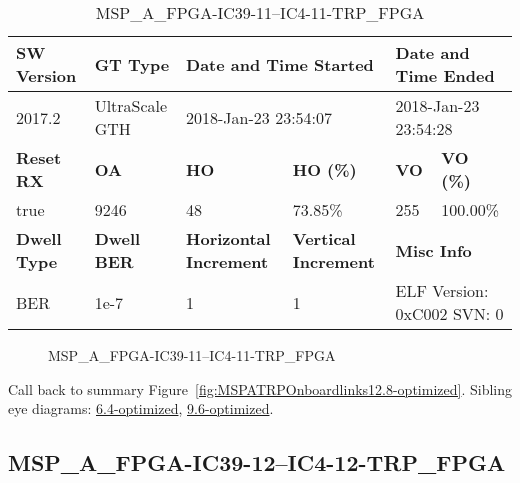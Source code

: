 \begin{table}[h]
\centering
\caption{MSP\_A\_FPGA-IC39-11--IC4-11-TRP\_FPGA}
\label{tab:MSPAFPGAIC3911IC411TRPFPGA12.8-optimized}
\begin{tabular}{@{}|l|l|l|l|l|l|@{}}
\toprule
\textbf{SW Version}                & \textbf{GT Type}   & \multicolumn{2}{l|}{\textbf{Date and Time Started}}            & \multicolumn{2}{l|}{\textbf{Date and Time Ended}}        \\ \midrule
2017.2                       & UltraScale GTH          & \multicolumn{2}{l|}{2018-Jan-23 23:54:07}                   & \multicolumn{2}{l|}{2018-Jan-23 23:54:28}               \\ \midrule
\textbf{Reset RX}                  & \textbf{OA} & \textbf{HO}   & \textbf{HO (\%)} & \textbf{VO} & \textbf{VO (\%)} \\ \midrule
true & 9246        & 48          & 73.85\%        & 255        & 100.00\%       \\ \midrule
\textbf{Dwell Type}                & \textbf{Dwell BER} & \textbf{Horizontal Increment} & \textbf{Vertical Increment}    & \multicolumn{2}{l|}{\textbf{Misc Info}}                  \\ \midrule
BER                            & 1e-7        & 1        & 1           & \multicolumn{2}{l|}{ELF Version: 0xC002 SVN: 0}                         \\ \bottomrule
\end{tabular}
\end{table}

\begin{figure}[h]
\caption{MSP\_A\_FPGA-IC39-11--IC4-11-TRP\_FPGA} \label{fig:MSPAFPGAIC3911IC411TRPFPGA12.8-optimized}
\end{figure}

Call back to summary Figure~\ref{fig:MSPATRPOnboardlinks12.8-optimized}.
Sibling eye diagrams: \hyperref[sec:MSPAFPGAIC3911IC411TRPFPGA6.4-optimized]{6.4-optimized}, \hyperref[sec:MSPAFPGAIC3911IC411TRPFPGA9.6-optimized]{9.6-optimized}.

\clearpage
\newpage


\subsection{MSP\_A\_FPGA-IC39-12--IC4-12-TRP\_FPGA}\label{sec:MSPAFPGAIC3912IC412TRPFPGA12.8-optimized}

